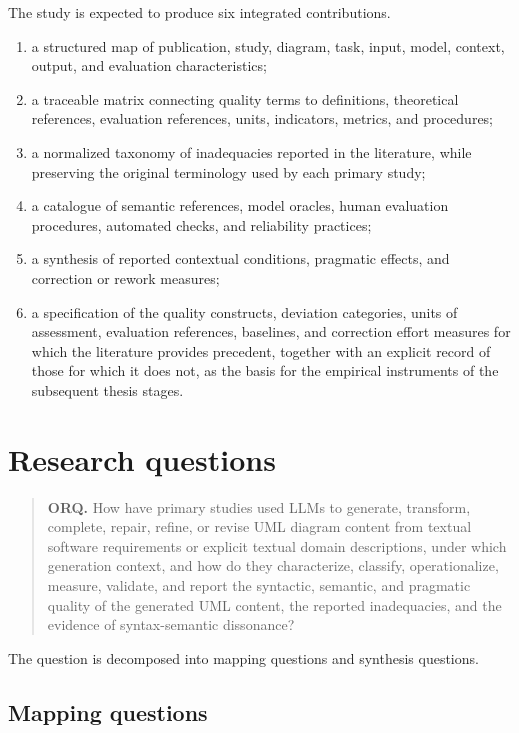 The study is expected to produce six integrated contributions.

\begin{enumerate}[label=\roman*)]
    \item a structured map of publication, study, diagram, task, input, model, context, output, and evaluation characteristics;
    \item a traceable matrix connecting quality terms to definitions, theoretical references, evaluation references, units, indicators, metrics, and procedures;
    \item a normalized taxonomy of inadequacies reported in the literature, while preserving the original terminology used by each primary study;
    \item a catalogue of semantic references, model oracles, human evaluation procedures, automated checks, and reliability practices;
    \item a synthesis of reported contextual conditions, pragmatic effects, and correction or rework measures;
    \item a specification of the quality constructs, deviation categories, units of assessment, evaluation references, baselines, and correction effort measures for which the literature provides precedent, together with an explicit record of those for which it does not, as the basis for the empirical instruments of the subsequent thesis stages.
\end{enumerate}

\section{Research questions}
\label{sec:protocol_questions}

\begin{quote}
\textbf{ORQ.} How have primary studies used LLMs to generate, transform, complete, repair, refine, or revise UML diagram content from textual software requirements or explicit textual domain descriptions, under which generation context, and how do they characterize, classify, operationalize, measure, validate, and report the syntactic, semantic, and pragmatic quality of the generated UML content, the reported inadequacies, and the evidence of syntax-semantic dissonance?
\end{quote}

The question is decomposed into mapping questions and synthesis questions.

\subsection{Mapping questions}

